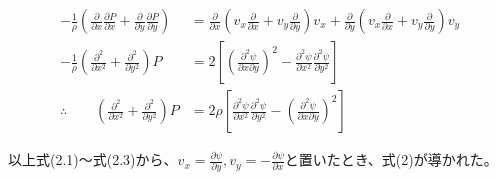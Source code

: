 \documentclass[a4paper,11pt]{jsarticle}
\begin{document}
\begin{align*}
  -\frac{1}{\rho}\left(\frac{\partial}{\partial x}\frac{\partial P}{\partial x} + \frac{\partial}{\partial y}\frac{\partial P}{\partial y}\right)
  &=   \frac{\partial}{\partial x}\left(v_x \frac{\partial}{\partial x} + v_y\frac{\partial}{\partial y}\right)v_x
  + \frac{\partial}{\partial y}\left(v_x \frac{\partial}{\partial x} + v_y\frac{\partial}{\partial y}\right) v_y \\
  -\frac{1}{\rho}\left(\frac{\partial^2}{\partial x^2} + \frac{\partial^2}{\partial y^2}\right)P 
&= 2\left[\left(\frac{\partial^2 \psi}{\partial x\partial y}\right)^2 - \frac{\partial^2 \psi}{\partial x^2}\frac{\partial^2 \psi}{\partial y^2}\right] \\
  \therefore \qquad\left(\frac{\partial^2}{\partial x^2} + \frac{\partial^2}{\partial y^2}\right)P 
  &=  2\rho\left[\frac{\partial^2 \psi}{\partial x^2}\frac{\partial^2 \psi}{\partial y^2} - \left(\frac{\partial^2 \psi}{\partial x\partial y}\right)^2\right] \qquad \tag{2.3}
\end{align*}

以上式(2.1)～式(2.3)から、\(v_x = \frac{\partial \psi}{\partial y}, v_y = -\frac{\partial \psi}{\partial x}\)と置いたとき、式(2)が導かれた。
\end{document}
